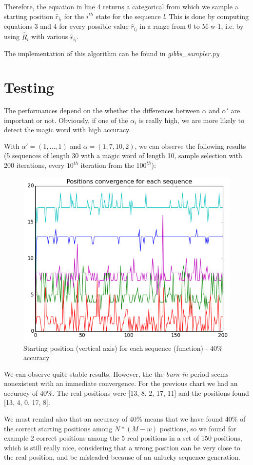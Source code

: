 Therefore, the equation in line 4 returns a categorical from which we sample a starting position $\widehat{r}_{i_l}$ for the $i^{th}$ state for the sequence \textit{l}.
This is done by computing equations 3 and 4 for every possible value $\widehat{r}_{i_l}$ in a range from 0 to M-w-1, i.e. by using $\widehat{R}_i$ with various $\widehat{r}_{i_l}$.

The implementation of this algorithm can be found in \textit{gibbs\_sampler.py}


\section{Testing}
The performances depend on the whether the differences between $\alpha$ and $\alpha'$ are important or not. Obviously, if one of the $\alpha_i$ is really high, we are more likely to detect the magic word with high accuracy.

With $\alpha' = (1,...,1)$ and $\alpha = (1,7,10,2)$, we can observe the following results (5 sequences of length 30 with a magic word of length 10, sample selection with 200 iterations, every $10^{th}$ iteration from the $100^{th}$):

\begin{figure}[H]
\centering
\includegraphics[width=0.7\linewidth]{img/c.png}
\caption{Starting position (vertical axis) for each sequence (function) - 40\% accuracy}
\end{figure}

We can observe quite stable results. However, the the \textit{burn-in} period seems nonexistent with an immediate convergence. For the previous chart we had an accuracy of 40\%. The real positions were [13, 8, 2, 17, 11] and the positions found [13, 4, 0, 17, 8].

We must remind also that an accuracy of 40\% means that we have found 40\% of the correct starting positions among $N * (M - w)$ positions, so we found for example 2 correct positions among the 5 real positions in a set of 150 positions, which is still really nice, considering that a wrong position can be very close to the real position, and be misleaded because of an unlucky sequence generation.

